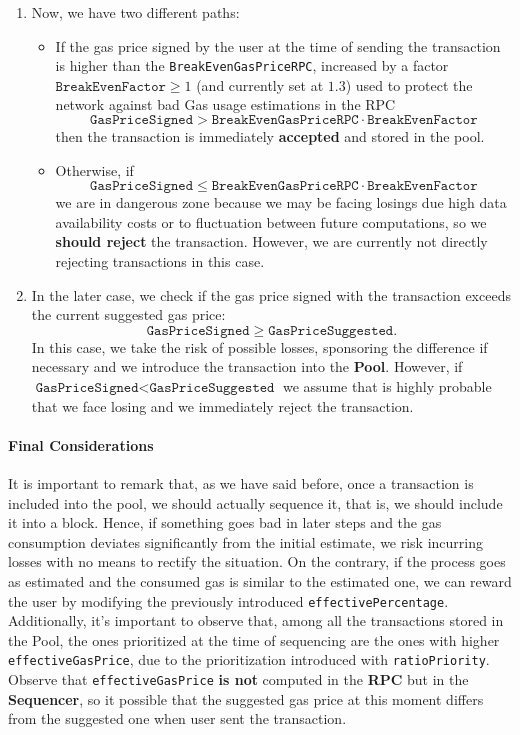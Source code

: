\begin{enumerate}
\item Now, we have two different paths:

\begin{itemize}

\item If the gas price signed by the user at the time of sending the transaction is higher than the \texttt{BreakEvenGasPriceRPC}, increased by a factor $\texttt{BreakEvenFactor} \geq 1$ (and currently set at $1.3$) used to protect the network against bad Gas usage estimations in the RPC
\[
\texttt{GasPriceSigned} > \texttt{BreakEvenGasPriceRPC} \cdot \texttt{BreakEvenFactor}
\]
then the transaction is immediately \textbf{accepted} and stored in the pool.

\item Otherwise, if
\[
\texttt{GasPriceSigned} \leq \texttt{BreakEvenGasPriceRPC} \cdot \texttt{BreakEvenFactor}
\]
we are in dangerous zone because we may be facing losings due high data availability costs or to fluctuation between future computations, so we \textbf{should reject} the transaction. However, we are currently not directly rejecting transactions in this case.

\end{itemize}

\item In the later case, we check if the gas price signed with the transaction exceeds the current suggested gas price:
\[
\texttt{GasPriceSigned} \geq \texttt{GasPriceSuggested}.
\]
In this case, we take the risk of possible losses, sponsoring the difference if necessary and we introduce the transaction into the \textbf{Pool}. However, if $\texttt{GasPriceSigned} < \texttt{GasPriceSuggested}$ we assume that is highly probable that we face losing and we immediately reject the transaction.

\end{enumerate}


\paragraph*{Final Considerations}

It is important to remark that, as we have said before, once a transaction is included into the pool, we should actually sequence it, that is, we should include it into a block. Hence, if something goes bad in later steps and the gas consumption deviates significantly from the initial estimate, we risk incurring losses with no means to rectify the situation. On the contrary, if the process goes as estimated and the consumed gas is similar to the estimated one, we can reward the user by modifying the previously introduced \texttt{effectivePercentage}. Additionally, it’s important to observe that, among all the transactions stored in the Pool, the ones prioritized at the time of sequencing are the ones with higher \texttt{effectiveGasPrice}, due to the prioritization introduced with \texttt{ratioPriority}. Observe that \texttt{effectiveGasPrice} \textbf{is not} computed in the \textbf{RPC} but in the \textbf{Sequencer}, so it possible that the suggested gas price at this moment differs from the suggested one when user sent the transaction.



